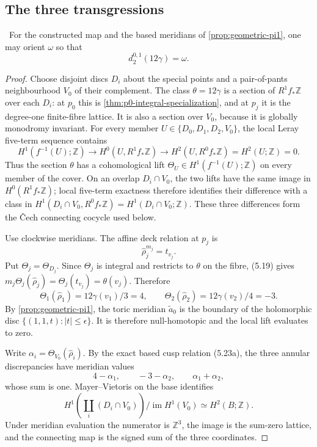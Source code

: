 \subsection{The three transgressions}

\begin{lemma}
\label{lem:first-transgression}
\Verified\ For the constructed map and the based meridians of
\cref{prop:geometric-pi1}, one may orient \(\omega\) so that
\[
 d_2^{0,1}(12\gamma)=\omega.
\tag{5.18}
\]
\end{lemma}

\begin{proof}
Choose disjoint discs \(D_i\) about the special points and a pair-of-pants
neighbourhood \(V_0\) of their complement.  The class
\(\theta=12\gamma\) is a section of \(R^1f_*\mathbb Z\) over each \(D_i\):
at \(p_0\) this is \cref{thm:p0-integral-specialization}, and at \(p_j\)
it is the degree-one finite-fibre lattice.  It is also a section over
\(V_0\), because it is globally monodromy invariant.  For every member
\(U\in\{D_0,D_1,D_2,V_0\}\), the local Leray five-term sequence contains
\[
 H^1(f^{-1}(U);\mathbb Z)\longrightarrow
 H^0(U,R^1f_*\mathbb Z)\longrightarrow
 H^2(U,R^0f_*\mathbb Z)=H^2(U;\mathbb Z)=0.
\]
Thus the section \(\theta\) has a cohomological lift
\(\Theta_U\in H^1(f^{-1}(U);\mathbb Z)\) on every member of the cover.
On an overlap \(D_i\cap V_0\), the two lifts have the same image in
\(H^0(R^1f_*\mathbb Z)\); local five-term exactness therefore identifies
their difference with a class in
\(H^1(D_i\cap V_0,R^0f_*\mathbb Z)=H^1(D_i\cap V_0;\mathbb Z)\).
These three differences form the \v{C}ech connecting cocycle used below.

Use clockwise meridians.  The affine deck relation at \(p_j\) is
\[
 \widehat\rho_j^{m_j}=t_{v_j}.
\tag{5.19}
\]
Put \(\Theta_j=\Theta_{D_j}\).  Since \(\Theta_j\) is integral and restricts
to \(\theta\) on the fibre, (5.19) gives
\(m_j\Theta_j(\widehat\rho_j)=\Theta_j(t_{v_j})=\theta(v_j)\).  Therefore
\[
 \Theta_1(\widehat\rho_1)=12\gamma(v_1)/3=4,
 \qquad
 \Theta_2(\widehat\rho_2)=12\gamma(v_2)/4=-3.
\tag{5.20}
\]
By \cref{prop:geometric-pi1}, the toric meridian
\(\widetilde a_0\) is the
boundary of the holomorphic disc
\(\{(1,1,t):|t|\le\epsilon\}\).  It is therefore null-homotopic and the
local lift evaluates to zero.

Write \(\alpha_i=\Theta_{V_0}(\widehat\rho_i)\).  By the exact based cusp
relation (5.23a), the three annular discrepancies have
meridian values
\[
 4-\alpha_1,\qquad -3-\alpha_2,\qquad \alpha_1+\alpha_2,
\tag{5.21}
\]
whose sum is one.  Mayer--Vietoris on the base identifies
\[
H^1\!\left(\coprod_i(D_i\cap V_0)\right)/\operatorname{im}H^1(V_0)
\simeq H^2(B;\mathbb Z).
\]
Under meridian evaluation the numerator is \(\mathbb Z^3\), the image is
the sum-zero lattice, and the connecting map is the signed sum of the three
coordinates.


\end{proof}
